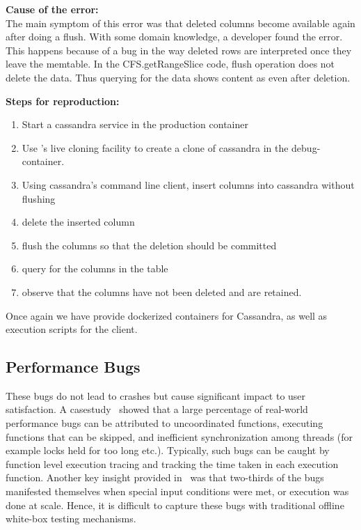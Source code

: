 \noindent \textbf{Cause of the error:} \\

The main symptom of this error was that deleted columns become available again after doing a flush.
With some domain knowledge, a developer found the error. 
This happens because of a bug in the way deleted rows are interpreted once they leave the memtable. 
In the CFS.getRangeSlice code, flush operation does not delete the data. 
Thus querying for the data shows content as even after deletion.

\noindent \textbf{Steps for reproduction:} \\

\begin{adjustwidth}{0.5cm}{}
	\begin{enumerate}
		\item Start a cassandra service in the production container
		\item Use \parikshan's live cloning facility to create a clone of cassandra in the debug-container.
		\item Using cassandra's command line client, insert columns into cassandra without flushing
		\item delete the inserted column
		\item flush the columns so that the deletion should be committed
		\item query for the columns in the table
		\item observe that the columns have not been deleted and are retained.
	\end{enumerate}
\end{adjustwidth}

Once again we have provide dockerized containers for Cassandra, as well as execution scripts for the client.

\subsection{Performance Bugs}

These bugs do not lead to crashes but cause significant impact to user satisfaction.
A casestudy~\cite{shanluPerf} showed that a large percentage of real-world performance bugs can be attributed to uncoordinated functions, executing functions that can be skipped, and inefficient synchronization among threads (for example locks held for too long etc.).
Typically, such bugs can be caught by function level execution tracing and tracking the time taken in each execution function.
Another key insight provided in~\cite{shanluPerf} was that two-thirds of the bugs manifested themselves when special input conditions were met, or execution was done at scale. 
Hence, it is difficult to capture these bugs with traditional offline white-box testing mechanisms.


